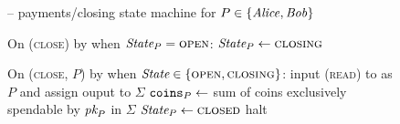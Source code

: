 \begin{figure}[H]
\begin{systembox}{\fchan{} -- payments/closing state machine for $P \in
  \{\mathit{Alice}, \mathit{Bob}\}$}
\begin{algorithmic}[1]
      \State On (\textsc{close}) by \environment when $\itistate_P =
      \textsc{open}$:
      \Indent
        \State $\itistate_P \gets \textsc{closing}$
      \EndIndent
      \Statex

      \State On (\textsc{close}, $P$) by \adversary when $\itistate \in
      \{\textsc{open}, \textsc{closing}\}$:
      \label{code:functionality:pay-close:check}
      \Indent
        \State input (\textsc{read}) to \ledger as $P$ and assign ouput to
        $\Sigma$
        \State $\texttt{coins}_{P} \gets$ sum of coins exclusively spendable by
        $\textit{pk}_{P}$ in $\Sigma$
        \label{code:functionality:pay-close:coins}
          \State $\itistate_P \gets \textsc{closed}$
        \Else \: 
          \State halt
          \label{code:functionality:pay-close:halt}
        \EndIf
      \EndIndent
    \end{algorithmic}
  \end{systembox}
  \caption{}
  \label{code:functionality:pay-close}
\end{figure}


